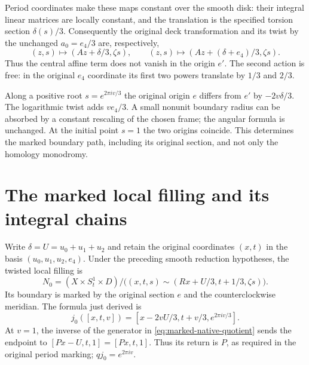 Period coordinates make these maps constant over the smooth disk:
their integral linear matrices are locally constant, and the
translation is the specified torsion section $\delta(s)/3$.
Consequently the original deck transformation and its twist by
the unchanged $a_0=e_4/3$ are, respectively,
\begin{equation}\label{eq:actual-affine-actions}
 (z,s)\longmapsto(Az+\delta/3,\zeta s),\qquad
 (z,s)\longmapsto(Az+(\delta+e_4)/3,\zeta s).
\end{equation}
Thus the central affine term does not vanish in the origin $e'$.
The second action is free: in the original $e_4$ coordinate its
first two powers translate by $1/3$ and $2/3$.

Along a positive root $s=e^{2\pi iv/3}$ the original origin $e$
differs from $e'$ by $-2v\delta/3$. The logarithmic twist adds
$ve_4/3$. A small nonunit boundary radius can be absorbed by a
constant rescaling of the chosen frame; the angular formula is
unchanged. At the initial point $s=1$ the two origins coincide.
This determines the marked boundary path, including its original
section, and not only the homology monodromy.

\section{The marked local filling and its integral chains}

Write $\delta=U=u_0+u_1+u_2$ and retain the original coordinates
$(x,t)$ in the basis $(u_0,u_1,u_2,e_4)$. Under the preceding
smooth reduction hypotheses, the twisted local filling is
\begin{equation}\label{eq:marked-native-quotient}
 N_0=(X\times S^1_t\times D)/
 \bigl((x,t,s)\sim(Rx+U/3,t+1/3,\zeta s)\bigr).
\end{equation}
Its boundary is marked by the original section $e$ and the
counterclockwise meridian. The formula just derived is
\begin{equation}\label{eq:marked-native-j}
 j_0([x,t,v])=[x-2vU/3,t+v/3,e^{2\pi iv/3}].
\end{equation}
At $v=1$, the inverse of the generator in
\eqref{eq:marked-native-quotient} sends the endpoint to
$[Px-U,t,1]=[Px,t,1]$. Thus its return is $P$, as required in
the original period marking; $qj_0=e^{2\pi iv}$.

